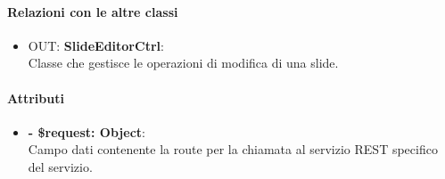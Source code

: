		\paragraph{Relazioni con le altre classi}
		\begin{itemize}
			\item OUT: \textbf{SlideEditorCtrl}:\\
			Classe che gestisce le operazioni di modifica di una slide.
		\end{itemize}
		
		\paragraph{Attributi}
		\begin{itemize}
			\item \textbf{- \$request: Object}:\\
			Campo dati contenente la route per la chiamata al servizio REST specifico del servizio.
		\end{itemize}	
		
